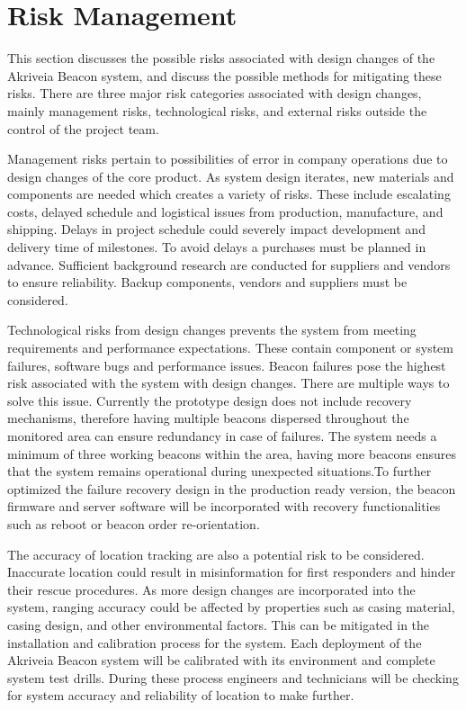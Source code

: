 

\setcounter{section}{3}
\section{Risk Management}
\bigskip
This section discusses the possible risks associated with design changes of the Akriveia Beacon system, and discuss the possible methods for mitigating these risks. There are three major risk categories associated with design changes, mainly management risks, technological risks, and external risks outside the control of the project team.

\bigskip
Management risks pertain to possibilities of error in company operations due to design changes of the core product. As system design iterates, new materials and components are needed which creates a variety of risks. These include escalating costs, delayed schedule and logistical issues from production, manufacture, and shipping. Delays in project schedule could severely impact development and delivery time of milestones. To avoid delays a purchases must be planned in advance. Sufficient background research are conducted for suppliers  and vendors to ensure reliability. Backup components, vendors and suppliers must be considered.

\bigskip
Technological risks from design changes prevents the system from meeting requirements and performance expectations. These contain component or system failures, software bugs and performance issues. Beacon failures pose the highest risk associated with the system with design changes. There are multiple ways to solve this issue. Currently the prototype design does not include recovery mechanisms, therefore having multiple beacons dispersed throughout the monitored area can ensure redundancy in case of failures. The system needs a minimum of three working beacons within the area, having more beacons ensures that the system remains operational during unexpected situations.To further optimized the failure recovery design in the production ready version, the beacon firmware and server software will be incorporated with recovery functionalities such as reboot or beacon order re-orientation. 

\bigskip
The accuracy of location tracking are also a potential risk to be considered. Inaccurate location could result in misinformation for first responders and hinder their rescue procedures. As more design changes are incorporated into the system, ranging accuracy could be affected by properties such as casing material, casing design, and other environmental factors. This can be mitigated in the installation and calibration process for the system. Each deployment of the Akriveia Beacon system will be calibrated with its environment and complete system test drills. During these process engineers and technicians will be checking for system accuracy and reliability of location to make further. 

